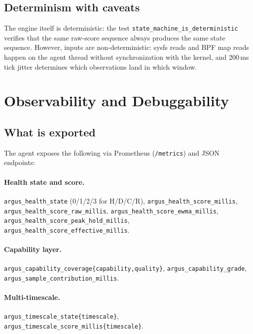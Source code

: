 \documentclass[11pt]{article}
\begin{document}
\subsection{Determinism with caveats}

The engine itself is deterministic: the test
\texttt{state\_machine\_is\_deterministic} verifies that the same raw-score
sequence always produces the same state sequence. However, inputs are
non-deterministic: sysfs reads and BPF map reads happen on the agent thread
without synchronization with the kernel, and 200\,ms tick jitter determines
which observations land in which window.


\section{Observability and Debuggability}
\label{sec:observability}

\subsection{What is exported}

The agent exposes the following via Prometheus (\texttt{/metrics}) and JSON
endpoints:

\paragraph{Health state and score.}
\texttt{argus\_health\_state} (0/1/2/3 for H/D/C/R),
\texttt{argus\_health\_score\_millis},
\texttt{argus\_health\_score\_raw\_millis},
\texttt{argus\_health\_score\_ewma\_millis},
\texttt{argus\_health\_score\_peak\_hold\_millis},
\texttt{argus\_health\_score\_effective\_millis}.

\paragraph{Capability layer.}
\texttt{argus\_capability\_coverage\{capability,quality\}},
\texttt{argus\_capability\_grade},
\texttt{argus\_sample\_contribution\_millis}.

\paragraph{Multi-timescale.}
\texttt{argus\_timescale\_state\{timescale\}},
\texttt{argus\_timescale\_score\_millis\{timescale\}}.
\end{document}
